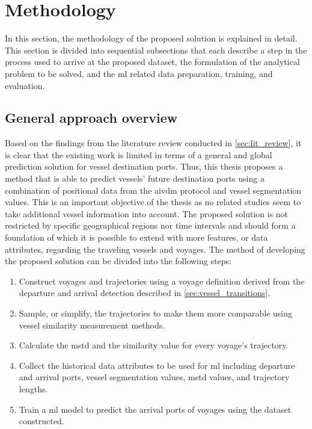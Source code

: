 \chapter{Methodology}
\label{chap:method}

In this section, the methodology of the proposed solution is explained in detail. This section is divided into sequential subsections that each describe a step in the process used to arrive at the proposed dataset, the formulation of the analytical problem to be solved, and the \acrfull{ml} related data preparation, training, and evaluation.

\section{General approach overview}

Based on the findings from the literature review conducted in \cref{sec:lit_review}, it is clear that the existing work is limited in terms of a general and global prediction solution for vessel destination ports. Thus, this thesis proposes a method that is able to predict vessels' future destination ports using a combination of positional data from the \gls{aivdm} protocol and vessel segmentation values. This is an important objective of the thesis as no related studies seem to take additional vessel information into account. The proposed solution is not restricted by specific geographical regions nor time intervals and should form a foundation of which it is possible to extend with more features, or data attributes, regarding the traveling vessels and voyages. The method of developing the proposed solution can be divided into the following steps:

\begin{enumerate}
    \item Construct voyages and trajectories using a voyage definition derived from the departure and arrival detection described in \cref{sec:vessel_transitions}.
    \item Sample, or simplify, the trajectories to make them more comparable using vessel similarity measurement methods.
    \item Calculate the \acrfull{mstd} and the similarity value for every voyage's trajectory.
    \item Collect the historical data attributes to be used for \acrfull{ml} including departure and arrival ports, vessel segmentation values, \acrshort{mstd} values, and trajectory lengths.
    \item Train a \acrshort{ml} model to predict the arrival ports of voyages using the dataset constructed.
\end{enumerate}


